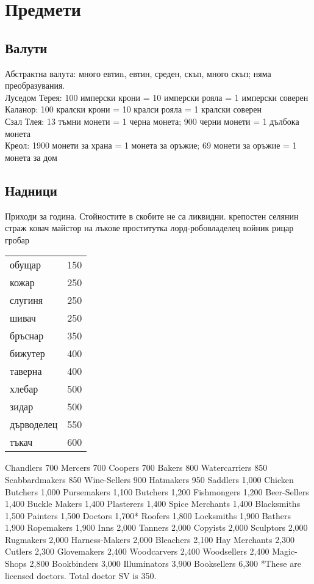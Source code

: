 \chapter{Предмети}
\section{Валути}
Абстрактна валута: много евтиn, евтин, среден, скъп, много скъп; няма преобразувания.  \\
Луседом Терея: 100 имперски крони = 10 имперски рояла = 1 имперски соверен             \\
Каланор: 100 кралски крони = 10 кралси рояла = 1 кралски соверен                       \\
Сзал Тлея: 13 тъмни монети = 1 черна монета; 900 черни монети = 1 дълбока монета       \\
Креол: 1900 монети за храна = 1 монета за оръжие; 69 монети за оръжие = 1 монета за дом

\section{Надници}
Приходи за година. Стойностите в скобите не са ликвидни.
крепостен селянин
страж
ковач
майстор на лъкове
проститутка
лорд-робовладелец
войник
рицар
гробар

\begin{tabular}{p{3cm} | p{2cm}}
обущар      & 150   \\
кожар       & 250   \\
слугиня     & 250   \\
шивач       & 250   \\
бръснар     & 350   \\
бижутер     & 400   \\
таверна     & 400   \\
хлебар      & 500   \\
зидар       & 500   \\
дърводелец  & 550   \\
тъкач       & 600   \\

\end{tabular}

Chandlers     700
Mercers     700
Coopers     700
Bakers                   800
Watercarriers     850
Scabbardmakers   850
Wine-Sellers     900
Hatmakers     950
Saddlers     1,000
Chicken Butchers  1,000
Pursemakers     1,100
Butchers     1,200
Fishmongers     1,200
Beer-Sellers     1,400
Buckle Makers     1,400
Plasterers     1,400
Spice Merchants   1,400
Blacksmiths     1,500
Painters     1,500
Doctors                   1,700*
Roofers       1,800
Locksmiths     1,900
Bathers                   1,900
Ropemakers     1,900
Inns                   2,000
Tanners                   2,000
Copyists    2,000
Sculptors    2,000
Rugmakers    2,000
Harness-Makers  2,000
Bleachers    2,100
Hay Merchants    2,300
Cutlers                  2,300
Glovemakers   2,400
Woodcarvers   2,400
Woodsellers   2,400
Magic-Shops   2,800
Bookbinders   3,000
Illuminators   3,900
Booksellers   6,300
*These are licensed doctors. Total doctor SV is 350.

